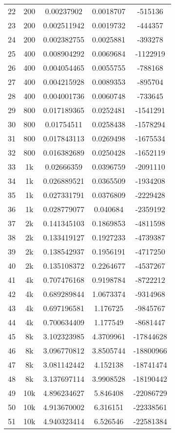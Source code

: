 \begin{center}
\begin{longtable}{|c|c|c|c|c|}
22 & 200 & 0.00237902 & 0.0018707 & -515136\\
23 & 200 & 0.002511942 & 0.0019732 & -444357\\
24 & 200 & 0.002382755 & 0.0025881 & -393278\\
\hline
25 & 400 & 0.008904292 & 0.0069684 & -1122919\\
26 & 400 & 0.004054465 & 0.0055755 & -788168\\
27 & 400 & 0.004215928 & 0.0089353 & -895704\\
28 & 400 & 0.004001736 & 0.0060748 & -733645\\
\hline
29 & 800 & 0.017189365 & 0.0252481 & -1541291\\
30 & 800 & 0.01754511 & 0.0258438 & -1578294\\
31 & 800 & 0.017843113 & 0.0269498 & -1675534\\
32 & 800 & 0.016382689 & 0.0250428 & -1652119\\
\hline
33 & 1k & 0.02666359 & 0.0396759 & -2091110\\
34 & 1k & 0.026889521 & 0.0365509 & -1934208\\
35 & 1k & 0.027331791 & 0.0376809 & -2229428\\
36 & 1k & 0.028779077 & 0.040684 & -2359192\\
\hline
37 & 2k & 0.141345103 & 0.1869853 & -4811598\\
38 & 2k & 0.133419127 & 0.1927233 & -4739387\\
39 & 2k & 0.138542937 & 0.1956191 & -4717250\\
40 & 2k & 0.135108372 & 0.2264677 & -4537267\\
\hline
41 & 4k & 0.707476168 & 0.9198784 & -8722212\\
42 & 4k & 0.689289844 & 1.0673374 & -9314968\\
43 & 4k & 0.697196581 & 1.176725 & -9845767\\
44 & 4k & 0.700634409 & 1.177549 & -8681447\\
\hline
45 & 8k & 3.102323985 & 4.3709961 & -17844628\\
46 & 8k & 3.096770812 & 3.8505744 & -18800966\\
47 & 8k & 3.081142442 & 4.152138 & -18741474\\
48 & 8k & 3.137697114 & 3.9908528 & -18190442\\
\hline
49 & 10k & 4.896234627 & 5.846408 & -22086729\\
50 & 10k & 4.913670002 & 6.316151 & -22338561\\
51 & 10k & 4.940323414 & 6.526546 & -22581384\\

\end{longtable}
\end{center}
